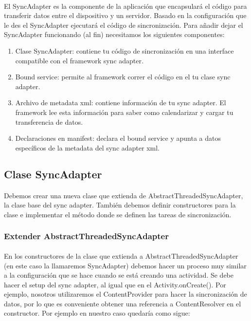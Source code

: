 \documentclass[10pt]{extarticle}
\begin{document}
\paragraph{}
El SyncAdapter es la componente de la aplicación que encapsulará el código para transferir datos entre el dispositivo y un servidor. Basado en la configuración que le des el SyncAdapter ejecutará el código de sincronización. Para añadir dejar el SyncAdapter funcionando (al fin) necesitamos los siguientes componentes:

\begin{enumerate}
	\item Clase SyncAdapter: contiene tu código de sincronización en una interface compatible con el framework sync adapter.
	\item Bound service: permite al framework correr el código en el tu clase sync adapter.
	\item Archivo de metadata xml: contiene información de tu sync adapter. El framework lee esta información para saber como calendarizar y cargar tu transferencia de datos.
	\item Declaraciones en manifest: declara el bound service y apunta a datos específicos de la metadata del sync adapter xml.
\end{enumerate}

\subsection{Clase SyncAdapter}

\paragraph{}
Debemos crear una nueva clase que extienda de AbstractThreadedSyncAdapter, la clase base del sync adapter. También debemos definir constructores para la clase e implementar el método donde se definen las tareas de sincronización.

\subsubsection{Extender AbstractThreadedSyncAdapter}

\paragraph{}
En los constructores de la clase que extienda a AbstractThreadedSyncAdapter (en este caso la llamaremos SyncAdapter) debemos hacer un proceso muy similar a la configuración que se hace cuando se está creando una actividad. Se debe hacer el setup del sync adapter, al igual que en el Activity.onCreate(). Por ejemplo, nosotros utilizaremos el ContentProvider para hacer la sincronización de datos, por lo que es conveniente obtener una referencia a ContentResolver en el constructor. Por ejemplo en nuestro caso quedaría como sigue:
\end{document}
